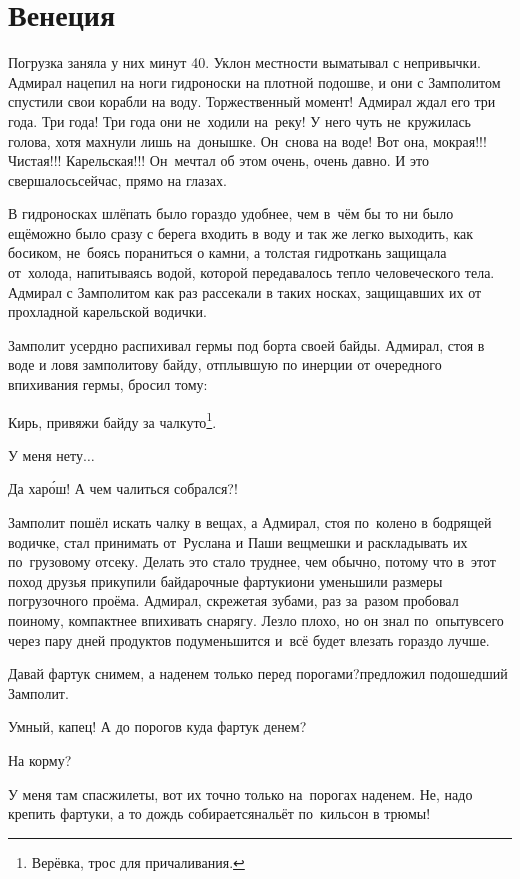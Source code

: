 \chapter{Венеция}
\vepsianrose

Погрузка заняла у них минут 40. Уклон местности выматывал с непривычки. Адмирал нацепил на ноги гидроноски на плотной подошве, и они с Замполитом спустили свои корабли на воду. Торжественный момент! Адмирал ждал его три года. Три года! Три года они не~ходили на~реку! У него чуть не~кружилась голова, хотя махнули лишь на~донышке. Он~снова на воде! Вот она, мокрая!!! Чистая!!! Карельская!!! Он~мечтал об этом очень, очень давно. И это свершалось\mdash сейчас, прямо на глазах.

В гидроносках шлёпать было гораздо удобнее, чем в~чём бы то ни было ещё\mdash можно было сразу с берега входить в воду и так же легко выходить, как босиком, не~боясь пораниться о камни, а толстая гидроткань защищала от~холода, напитываясь водой, которой передавалось тепло человеческого тела. Адмирал с Замполитом как раз рассекали в таких носках, защищавших их от прохладной карельской водички.

Замполит усердно распихивал гермы под борта своей байды. Адмирал, стоя в воде и ловя замполитову байду, отплывшую по инерции от очередного впихивания гермы, бросил тому:

\diagdash Кирь, привяжи байду за чалку\sdash то\footnote{Верёвка, трос для причаливания.}.

\diagdash У меня нету$\ldots$

\diagdash Да хар\'{о}ш! А чем чалиться собрался?!

Замполит пошёл искать чалку в вещах, а Адмирал, стоя по~колено в бодрящей водичке, стал принимать от~Руслана и Паши вещмешки и раскладывать их по~грузовому отсеку. Делать это стало труднее, чем обычно, потому что в~этот поход друзья прикупили байдарочные фартуки\mdash они уменьшили размеры погрузочного проёма. Адмирал, скрежетая зубами, раз за~разом пробовал по\sdash иному, компактнее впихивать снарягу. Лезло плохо, но он знал по~опыту\mdash всего через пару дней продуктов подуменьшится и~всё будет влезать гораздо лучше.

\diagdash Давай фартук снимем, а наденем только перед порогами?\mdash предложил подошедший Замполит. 

\diagdash Умный, капец! А до порогов куда фартук денем? 

\diagdash На корму?

\diagdash У меня там спасжилеты, вот их точно только на~порогах наденем. Не, надо крепить фартуки, а то дождь собирается\mdash нальёт по~кильсон в трюмы!

